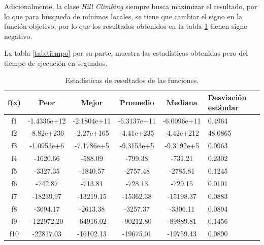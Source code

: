 \documentclass[12pt,twoside]{article}
\begin{document}
Adicionalmente,  la clase \textit{Hill Climbing} siempre busca maximizar el resultado, por lo que para búsqueda de mínimos locales, se tiene que cambiar el signo en la función objetivo, por lo que los resultados obtenidos en la tabla \ref{tab:res} tienen signo negativo.

La tabla \ref{tab:tiempo} por su parte, muestra las estadísticas obtenidas pero del tiempo de ejecución en segundos. 

\begin{table}[h]
	\centering
	\begin{tabular}{|c|c|c|c|c|p{2.1cm}|}  
		\hline
		\textbf{f(x)} & \textbf{Peor} & \textbf{Mejor} & \textbf{Promedio} & \textbf{Mediana} & \textbf{Desviación estándar} \\  
		\hline
		f1  & -1.4336e+12 & -2.1804e+11 & -6.3137e+11 & -6.0096e+11 & 0.4964 \\
		f2  & -8.82e+236  & -2.27e+165  & -4.41e+235  & -4.42e+212  & 48.0865 \\
		f3  & -1.0953e+6  & -7.1786e+5  & -9.3153e+5  & -9.3192e+5  & 0.0963 \\
		f4  & -1620.66     & -588.09     & -799.38     & -731.21     & 0.2302 \\
		f5  & -3327.35     & -1840.57    & -2757.48    & -2785.81    & 0.1245 \\
		f6  & -742.87      & -713.81     & -728.13     & -729.15     & 0.0101 \\
		f7  & -18239.97    & -13219.15   & -15362.38   & -15198.37   & 0.0883 \\
		f8  & -3694.17     & -2613.38    & -3257.37    & -3306.11    & 0.0894 \\
		f9  & -122972.20   & -64916.02   & -90212.80   & -89889.81   & 0.1456 \\
		f10 & -22817.03    & -16102.13   & -19675.01   & -19759.43   & 0.0890 \\
		\hline
	\end{tabular}
	\caption{Estadísticas de resultados de las funciones.}
	\label{tab:res}
\end{table}
\end{document}
